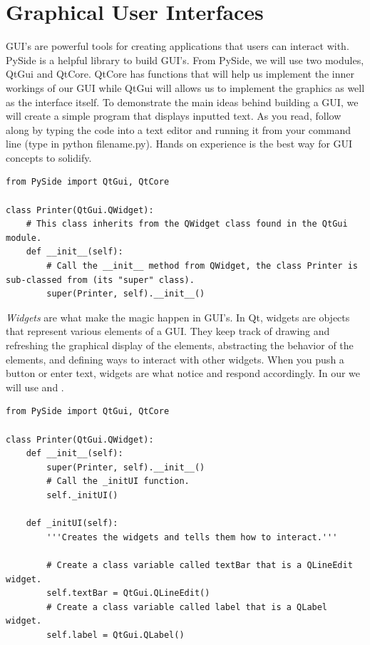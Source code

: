 \label{lab:OOP}

\section*{Graphical User Interfaces}

GUI's are powerful tools for creating applications that users can interact with.
PySide is a helpful library to build GUI's.
From PySide, we will use two modules, QtGui and QtCore.
QtCore has functions that will help us implement the inner workings of our GUI while QtGui will allows us to implement the graphics as well as the interface itself.
To demonstrate the main ideas behind building a GUI, we will create a simple program that displays inputted text. As you read, follow along by typing the code into a text editor and running it from your command line (type in python filename.py). Hands on experience is the best way for GUI concepts to solidify.

\begin{lstlisting}
from PySide import QtGui, QtCore

class Printer(QtGui.QWidget):
	# This class inherits from the QWidget class found in the QtGui module.
	def __init__(self):
		# Call the __init__ method from QWidget, the class Printer is sub-classed from (its "super" class).
		super(Printer, self).__init__()

\end{lstlisting}

\emph{Widgets} are what make the magic happen in GUI's.
In Qt, widgets are objects that represent various elements of a GUI.
They keep track of drawing and refreshing the graphical display of the elements, abstracting the behavior of the elements, and defining ways to interact with other widgets.
When you push a button or enter text, widgets are what notice and respond accordingly.
In our  we will use  and .

\begin{lstlisting}
from PySide import QtGui, QtCore

class Printer(QtGui.QWidget):
	def __init__(self):
		super(Printer, self).__init__()
		# Call the _initUI function.
		self._initUI()
	
	def _initUI(self):
		'''Creates the widgets and tells them how to interact.'''
		
		# Create a class variable called textBar that is a QLineEdit widget.
		self.textBar = QtGui.QLineEdit()
		# Create a class variable called label that is a QLabel widget.
		self.label = QtGui.QLabel()

\end{lstlisting}

